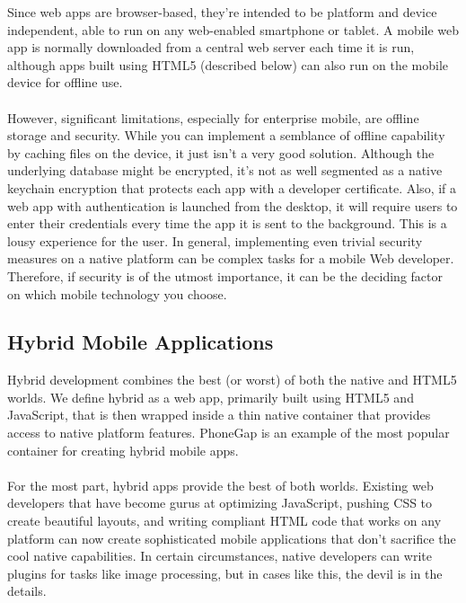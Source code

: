 Since web apps are browser-based, they’re intended to be platform and device independent, able to run on any web-enabled smartphone or tablet. A mobile web app is normally downloaded from a central web server each time it is run, although apps built using HTML5 (described below) can also run on the mobile device for offline use.

\paragraph{}
However, significant limitations, especially for enterprise mobile, are offline storage and security. While you can implement a semblance of offline capability by caching files on the device, it just isn't a very good solution. Although the underlying database might be encrypted, it’s not as well segmented as a native keychain encryption that protects each app with a developer certificate. Also, if a web app with authentication is launched from the desktop, it will require users to enter their credentials every time the app it is sent to the background. This is a lousy experience for the user. In general, implementing even trivial security measures on a native platform can be complex tasks for a mobile Web developer. Therefore, if security is of the utmost importance, it can be the deciding factor on which mobile technology you choose.



\subsection{Hybrid Mobile Applications}

Hybrid development combines the best (or worst) of both the native and HTML5 worlds. We define hybrid as a web app, primarily built using HTML5 and JavaScript, that is then wrapped inside a thin native container that provides access to native platform features. PhoneGap is an example of the most popular container for creating hybrid mobile apps.

\paragraph{}
For the most part, hybrid apps provide the best of both worlds. Existing web developers that have become gurus at optimizing JavaScript, pushing CSS to create beautiful layouts, and writing compliant HTML code that works on any platform can now create sophisticated mobile applications that don’t sacrifice the cool native capabilities. In certain circumstances, native developers can write plugins for tasks like image processing, but in cases like this, the devil is in the details.

